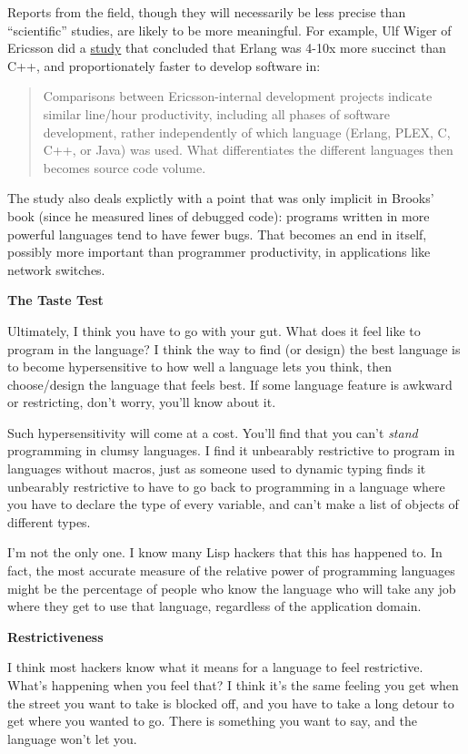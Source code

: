 \documentclass[12pt]{book}
\begin{document}
Reports from the field, though they will necessarily be less precise
than ``scientific'' studies, are likely to be more meaningful. For
example, Ulf Wiger of Ericsson did a
\href{http://www.erlang.se/publications/Ulf_Wiger.pdf}{study} that
concluded that Erlang was 4-10x more succinct than C++, and
proportionately faster to develop software in:

\begin{quote}
Comparisons between Ericsson-internal development projects indicate
similar line/hour productivity, including all phases of software
development, rather independently of which language (Erlang, PLEX, C,
C++, or Java) was used. What differentiates the different languages then
becomes source code volume.
\end{quote}

The study also deals explictly with a point that was only implicit in
Brooks' book (since he measured lines of debugged code): programs
written in more powerful languages tend to have fewer bugs. That becomes
an end in itself, possibly more important than programmer productivity,
in applications like network switches.

\textbf{The Taste Test}

Ultimately, I think you have to go with your gut. What does it feel like
to program in the language? I think the way to find (or design) the best
language is to become hypersensitive to how well a language lets you
think, then choose/design the language that feels best. If some language
feature is awkward or restricting, don't worry, you'll know about it.

Such hypersensitivity will come at a cost. You'll find that you can't
\emph{stand} programming in clumsy languages. I find it unbearably
restrictive to program in languages without macros, just as someone used
to dynamic typing finds it unbearably restrictive to have to go back to
programming in a language where you have to declare the type of every
variable, and can't make a list of objects of different types.

I'm not the only one. I know many Lisp hackers that this has happened
to. In fact, the most accurate measure of the relative power of
programming languages might be the percentage of people who know the
language who will take any job where they get to use that language,
regardless of the application domain.

\textbf{Restrictiveness}

I think most hackers know what it means for a language to feel
restrictive. What's happening when you feel that? I think it's the same
feeling you get when the street you want to take is blocked off, and you
have to take a long detour to get where you wanted to go. There is
something you want to say, and the language won't let you.
\end{document}
